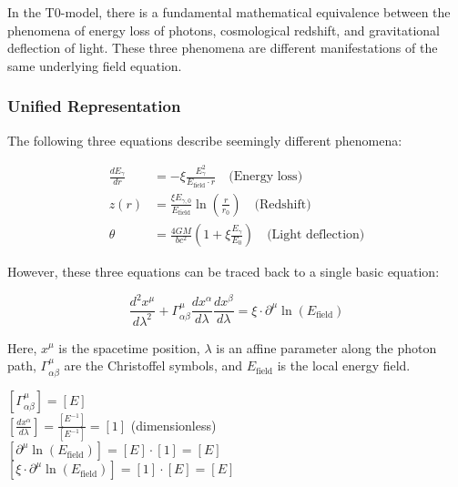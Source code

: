 \documentclass[12pt,a4paper]{article}
\theoremstyle{definition}
\begin{document}
	In the T0-model, there is a fundamental mathematical equivalence between the phenomena of energy loss of photons, cosmological redshift, and gravitational deflection of light. These three phenomena are different manifestations of the same underlying field equation.
	
	\subsubsection{Unified Representation}
	
	The following three equations describe seemingly different phenomena:
	
	\begin{align}
		\frac{dE_\gamma}{dr} &= -\xi \frac{E_\gamma^2}{E_{\text{field}} \cdot r} \quad \text{(Energy loss)} \\
		z(r) &= \frac{\xi E_{\gamma,0}}{E_{\text{field}}} \ln\left(\frac{r}{r_0}\right) \quad \text{(Redshift)} \\
		\theta &= \frac{4GM}{bc^2}\left(1 + \xi \frac{E_\gamma}{E_0}\right) \quad \text{(Light deflection)}
	\end{align}
	
	However, these three equations can be traced back to a single basic equation:
	
	\begin{equation}
		\boxed{\frac{d^2 x^\mu}{d\lambda^2} + \Gamma^\mu_{\alpha\beta}\frac{dx^\alpha}{d\lambda}\frac{dx^\beta}{d\lambda} = \xi \cdot \partial^\mu \ln(E_{\text{field}})}
	\end{equation}
	
	Here, $x^\mu$ is the spacetime position, $\lambda$ is an affine parameter along the photon path, $\Gamma^\mu_{\alpha\beta}$ are the Christoffel symbols, and $E_{\text{field}}$ is the local energy field.
	
	\begin{einheitencheck}
		$[\Gamma^\mu_{\alpha\beta}] = [E]$ \checkmark\\
		$[\frac{dx^\alpha}{d\lambda}] = \frac{[E^{-1}]}{[E^{-1}]} = [1]$ (dimensionless) \checkmark\\
		$[\partial^\mu \ln(E_{\text{field}})] = [E] \cdot [1] = [E]$ \checkmark\\
		$[\xi \cdot \partial^\mu \ln(E_{\text{field}})] = [1] \cdot [E] = [E]$ \checkmark
	\end{einheitencheck}
	
\end{document}
